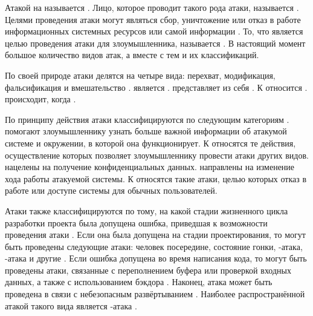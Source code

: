 %
Атакой на  называется  
.
%
Лицо, которое проводит такого рода атаки, называется  
. 
%
Целями проведения атаки могут являться сбор, уничтожение или отказ в работе информационных 
системных ресурсов или самой информации . 
%
То, что является целью проведения атаки для злоумышленника, называется 
. 
%
В настоящий момент большое количество видов атак, а вместе с тем и их классификаций.

%
По своей природе атаки делятся на четыре вида: перехват, модификация, фальсификация и вмешательство 
. 
%
 является .
%
 представляет из себя .
%
К  относится .
%
 происходит, когда .

%
По принципу действия атаки классифицируются по следующим категориям .
%
 помогают злоумышленнику узнать больше важной 
информации об атакумой системе и окружении, в которой она функционирует.
%
К  относятся те действия, осуществление которых позволяет 
злоумышленнику провести атаки других видов. 
%
 нацелены на получение конфиденциальных данных. 
%
 направлены на изменение хода работы атакуемой системы. 
%
К  относятся такие атаки, целью которых отказ в работе или 
доступе системы для обычных пользователей. 

%
Атаки также классифицируются по тому, на какой стадии жизненного цикла разработки проекта была 
допущена ошибка, приведшая к возможности проведения атаки .
%
Если она была допущена на стадии проектирования, то могут быть проведены следующие атаки: 
человек посередине, состояние гонки, -атака, -атака и 
другие .
%
Если ошибка допущена во время написания кода, то могут быть проведены атаки, связанные с 
переполнением буфера или проверкой входных данных, а также с использованием бэкдора 
.
%
Наконец, атака может быть проведена в связи с небезопасным развёртыванием . 
Наиболее распространённой атакой такого вида является -атака 
. 

